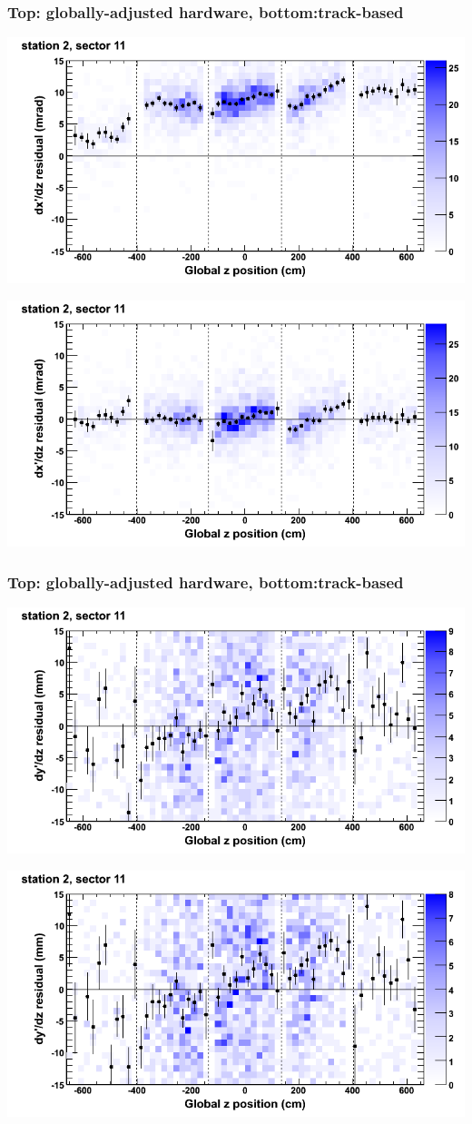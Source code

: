 \documentclass[compress]{beamer}
\begin{document}
\begin{frame}
\frametitle{Top: globally-adjusted hardware, bottom:track-based}
\includegraphics[width=0.7\linewidth]{NOV4_mapplots_HW/DTvsz_st2sec11_dxdz.png}

\includegraphics[width=0.7\linewidth]{NOV4_mapplots/DTvsz_st2sec11_dxdz.png}
\end{frame}

\begin{frame}
\frametitle{Top: globally-adjusted hardware, bottom:track-based}
\includegraphics[width=0.7\linewidth]{NOV4_mapplots_HW/DTvsz_st2sec11_dydz.png}

\includegraphics[width=0.7\linewidth]{NOV4_mapplots/DTvsz_st2sec11_dydz.png}
\end{frame}
\end{document}
